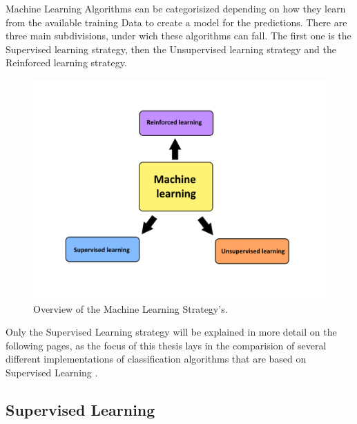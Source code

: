 \documentclass[12pt,oneside,a4paper,parskip]{scrbook}
\begin{document}
Machine Learning Algorithms can be categorisized depending on how they learn from the available training Data to create 
a model for the predictions. There are three main subdivisions, under wich these algorithms can fall. 
The first one is the Supervised learning strategy, then the Unsupervised learning strategy and the Reinforced learning 
strategy. 

\begin{figure}
  \includegraphics[width=\linewidth]{Overview_ml}
  \caption{Overview of the Machine Learning Strategy's.}
  \label{fig:overview_ML}
\end{figure}

Only the Supervised Learning strategy will be explained in more detail on the following pages, as the focus of this 
thesis lays in the comparision of several different implementations of classification algorithms that are based on 
Supervised Learning \cite{IntroML}.

\subsection{Supervised Learning}
\end{document}
